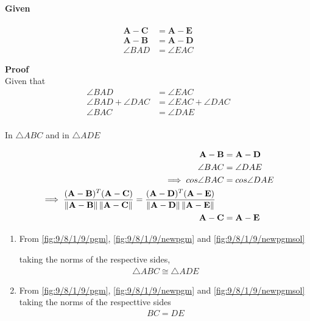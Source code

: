 \documentclass[10pt,a4paper]{article}
\let\vec\mathbf
\begin{document}
\paragraph{Given}
\begin{align}
\vec{A}-\vec{C} &=\vec{A}-\vec{E} \\
\vec{A}-\vec{B} &=\vec{A}-\vec{D}\\
\angle BAD &=\angle EAC
\end{align}
	

\textbf{Proof}\\
Given that
\begin{align*}
\angle BAD &=\angle EAC\\
\angle BAD+\angle DAC &=\angle EAC+\angle DAC\\
\angle BAC &=\angle DAE\\
\end{align*}


In $\triangle ABC $ and in $\triangle ADE$

\begin{align}
\vec{A}-\vec{B}&=\vec{A}-\vec{D}
\label{fig:9/8/1/9/pgm}\\
\angle BAC &=\angle DAE\\
\implies cos \angle BAC &=cos \angle DAE\\
\begin{split}
\implies \frac{(\vec{A}-\vec{B})^T(\vec{A}-\vec{C})}{\norm{\vec{A}-\vec{B}}\norm{\vec{A}-\vec{C}}} &=
\frac{(\vec{A}-\vec{D})^T(\vec{A}-\vec{E})}{\norm{\vec{A}-\vec{D}}\norm{\vec{A}-\vec{E}}}
\end{split}
\label{fig:9/8/1/9/newpgm}\\
\vec{A}-\vec{C}&=\vec{A}-\vec{E}
\label{fig:9/8/1/9/newpgmsol}
\end{align}

	
\begin{enumerate}
    \item From 
		\eqref{fig:9/8/1/9/pgm}, 
		\eqref{fig:9/8/1/9/newpgm}
		and 
		\eqref{fig:9/8/1/9/newpgmsol}
		
		taking the norms of the respective sides, 
    \begin{align}
        \triangle ABC \cong \triangle ADE
    \end{align}
    
\item From  
		\eqref{fig:9/8/1/9/pgm}, 
		\eqref{fig:9/8/1/9/newpgm}
		and 
		\eqref{fig:9/8/1/9/newpgmsol}
 taking the norms of the respecttive sides
 \begin{align}
BC=DE
 \end{align}    
\end{enumerate}
\end{document}
